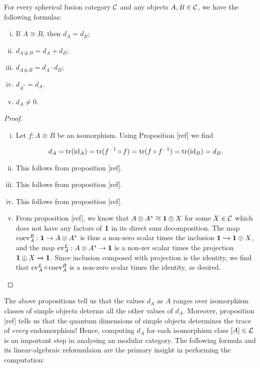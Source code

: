 \begin{prop} For every spherical fusion category ${\mathcal C}$ and any objects $A,B\in {\mathcal C}$, we have the following formulas:

\begin{enumerate}[(i)]
\item If $A\cong B$, then $d_A=d_B$;
\item $d_{A\oplus B}=d_{A}+d_B$;
\item $d_{A\otimes B}=d_{A}\cdot d_{B}$;
\item $d_{A^*}=d_A$.
\item $d_A\neq 0$.
\end{enumerate}
\end{prop}
\begin{proof}$\,$
\begin{enumerate}[(i)]
\item Let $f:A\cong B$ be an isomorphism. Using Proposition [ref] we find

$$d_A=\operatorname{tr}(\operatorname{id}_{A})=\operatorname{tr}(f^{-1}\circ f)=\operatorname{tr}(f\circ f^{-1})=\operatorname{tr}(\operatorname{id}_{B})=d_B.$$

\item This follows from proposition [ref].
\item This follows from proposition [ref].
\item This follows from proposition [ref].
\item From proposition [ref], we know that $A\otimes A^* \cong {\mathbf 1} \oplus X$ for some $X\in {\mathcal C}$ which does not have any factors of ${\mathbf 1}$ in its direct sum decomposition. The map $\operatorname{coev}^R_A: {\mathbf 1} \to A\otimes A^*$ is thus a non-zero scalar times the inclusion ${\mathbf 1} \hookrightarrow{} {\mathbf 1}\oplus X$, and the map $\operatorname{ev}^L_A: A\otimes A^*\to {\mathbf 1}$ is a non-zer scalar times the projection ${\mathbf 1} \oplus X \xrightarrow{}{\mathbf 1}$. Since inclusion composed with projection is the identity, we find that $\operatorname{ev}^{L}_{A}\circ \operatorname{coev}^R_{A}$ is a non-zero scalar times the identity, as desired.
\end{enumerate}
\end{proof}

The above propositions tell us that the values $d_A$ as $A$ ranges over isomorphism classes of simple objects determs all the other values of $d_A$. Moreover, proposition [ref] tells us that the quantum dimensions of simple objects determines the trace of \textit{every} endomorphism! Hence, computing $d_{A}$ for each isomorphism class $[A]\in {\mathcal L}$ is an important step in analysing an modular category. The following formula and its linear-algebraic reformulaion are the primary insight in performing the computation:

